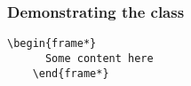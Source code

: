 \documentclass{ltx-talk}
\begin{document}
\begin{Frame}
  \frametitle{Demonstrating the class}
  \begin{Verbatim}[gobble = 4]
    \begin{frame*}
      Some content here
    \end{frame*}
  \end{Verbatim}
\end{Frame}
\end{document}
